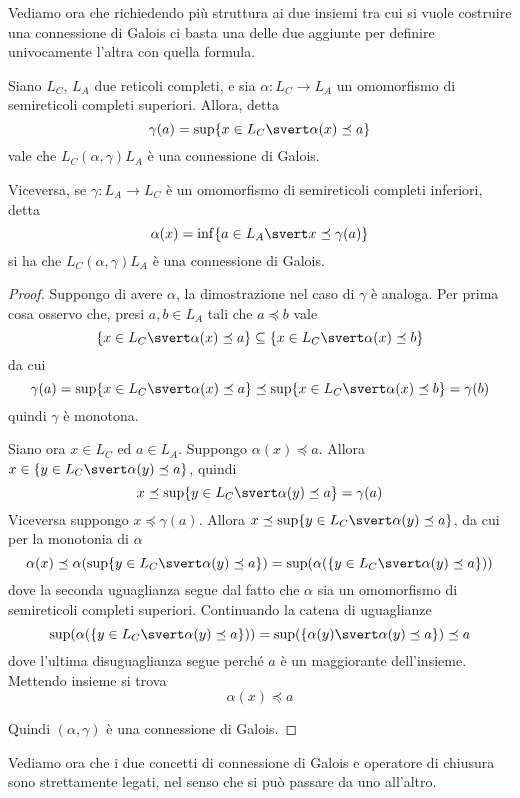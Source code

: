 \documentclass[12pt]{article}
\numberwithin{theorem}{subsection}
\begin{document}
Vediamo ora che richiedendo più struttura ai due insiemi tra cui si vuole costruire una connessione di Galois ci basta una delle due aggiunte per definire univocamente l'altra con quella formula.
\begin{prop}
	Siano $L_C$, $L_A$ due reticoli completi, e sia $\alpha : L_C \rightarrow L_A$ un omomorfismo di semireticoli completi superiori.
	Allora, detta
	\[
	\gamma(a) = \sup \{ x \in L_C \svert \alpha(x) \preceq a \}
	\]
	vale che $L_C (\alpha, \gamma) L_A$ è una connessione di Galois.
	
	Viceversa, se $\gamma : L_A \rightarrow L_C$ è un omomorfismo di semireticoli completi inferiori, detta
	\[
	\alpha(x) = \inf \{ a \in L_A \svert x \preceq \gamma(a) \}
	\]
	si ha che $L_C (\alpha, \gamma) L_A$ è una connessione di Galois.
\end{prop}
\begin{proof}
	Suppongo di avere $\alpha$, la dimostrazione nel caso di $\gamma$ è analoga.
	Per prima cosa osservo che, presi $a, b \in L_A$ tali che $a \preceq b$ vale
	\[
		\{ x \in L_C \svert \alpha(x) \preceq a \} \subseteq \{ x \in L_C \svert \alpha(x) \preceq b \}
	\]
	da cui
	\[
		\gamma(a) = \sup \{ x \in L_C \svert \alpha(x) \preceq a \} \preceq \sup \{ x \in L_C \svert \alpha(x) \preceq b \} = \gamma(b)
	\]
	quindi $\gamma$ è monotona.
	
	Siano ora $x \in L_C$ ed $a \in L_A$.
	Suppongo $\alpha(x) \preceq a$. Allora $x \in \{ y \in L_C \svert \alpha(y) \preceq a \}$, quindi
	\[
	x \preceq \sup \{ y \in L_C \svert \alpha(y) \preceq a \} = \gamma(a)
	\]
	Viceversa suppongo $x \preceq \gamma(a)$. Allora $x \preceq \sup \{ y \in L_C \svert \alpha(y) \preceq a \}$, da cui per la monotonia di $\alpha$
	\[
	\alpha(x) \preceq \alpha(\sup \{ y \in L_C \svert \alpha(y) \preceq a \}) = \sup (\alpha (\{ y \in L_C \svert \alpha(y) \preceq a \}))
	\]
	dove la seconda uguaglianza segue dal fatto che $\alpha$ sia un omomorfismo di semireticoli completi superiori. Continuando la catena di uguaglianze
	\[
	\sup (\alpha (\{ y \in L_C \svert \alpha(y) \preceq a \})) = \sup (\{ \alpha (y) \svert \alpha(y) \preceq a \}) \preceq a
	\]
	dove l'ultima disuguaglianza segue perché $a$ è un maggiorante dell'insieme. Mettendo insieme si trova
	\[
	\alpha(x) \preceq a
	\]
	
	Quindi $(\alpha, \gamma)$ è una connessione di Galois.
\end{proof}

Vediamo ora che i due concetti di connessione di Galois e operatore di chiusura sono strettamente legati, nel senso che si può passare da uno all'altro.
\end{document}
